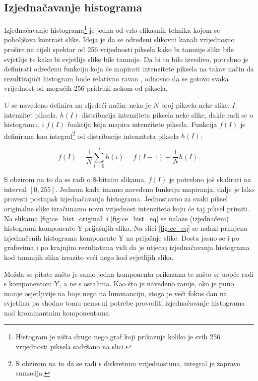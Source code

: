 \documentclass[times, utf8, diplomski]{fer}
\begin{document}
\subsection{Izjednačavanje histograma}
Izjednačavanje histograma\footnote{Histogram je ništa drugo nego graf koji prikazuje koliko je svih 256 vrijednosti piksela sadržano na slici.}  je jedna od vrlo efikasnih tehnika kojom se poboljšava kontrast slike. Ideja je da se određeni slikovni kanali vrijednosno prošire na cijeli spektar od 256 vrijednosti piksela kako bi tamnije slike bile svjetlije te kako bi svjetlije slike bile tamnije. Da bi to bilo izvedivo, potrebno je definirati određenu funkciju koja će mapirati intenzitete piksela na takav način da rezultirajući histogram bude relativno ravan , odnosno da se gotovo svaka vrijednost od mogućih 256 pridruži nekom od piksela.

U \citep{szeliski} se navedeno definira na sljedeći način: neka je $N$ broj piksela neke slike, $I$ intenzitet piksela, $h(I)$ distribucija intenziteta piksela neke slike, dakle radi se o histogramu, i $f(I)$ funkcija koja mapira intenzitete piksela. Funkcija $f(I)$ je definirana kao integral\footnote{S obzirom na to da se radi s diskretnim vrijednostima, integral je zapravo sumacija.} od distribucije intenziteta piksela $h(I)$:

\begin{equation}
    f(I) = \frac{1}{N}\sum_{i=0}^{I}h(i) = f(I-1) + \frac{1}{N}h(I).
\end{equation}

\bigskip

S obzirom na to da se radi o 8-bitnim slikama, $f(I)$ je potrebno još skalirati na interval $[0,255]$. Jednom kada imamo navedenu funkciju mapiranja, dalje je lako provesti postupak izjednačavanja histograma. Jednostavno za svaki piksel originalne slike izračunamo novu vrijednost intenziteta koju će taj piksel primiti. Na slikama \ref{fig:ce_hist_original} i \ref{fig:ce_hist_eq} se nalaze (izjednačeni) histogrami komponente Y prijašnjih slika. Na slici \ref{fig:ce_eq} se nalazi primjena izjednačenih histograma komponente Y na prijašnje slike. Dosta jasno se i po grafovima i po krajnjim rezultatima vidi da je utjecaj izjednačavanja histograma kod tamnijih slika izrazito veći nego kod svjetlijih slika.

Možda se pitate zašto je samo jedna komponenta prikazana te zašto se uopće radi s komponentom Y, a ne s ostalima. Kao što je navedeno ranije, oko je puno manje osjetljivije na boje nego na luminanciju, stoga je veći fokus dan na svjetlinu pa shodno tomu nema ni potrebe provoditi izjednačavanje histograma nad krominantnim komponentama.
\end{document}
